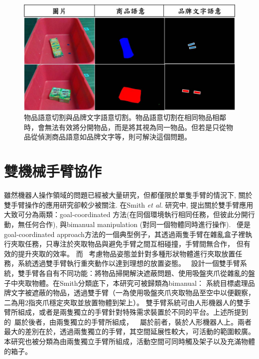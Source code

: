 \begin{figure}[H]
	\centering
	\includegraphics[height=!, width=1.0\linewidth, keepaspectratio=true]
	{./figures/product_vs_bn.jpg}
  \caption{物品語意切割與品牌文字語意切割。物品語意切割在相同物品相鄰時，會無法有效將分開物品，而是將其視為同一物品。但若是只從物品從偵測商品語意如品牌文字等，則可解決這個問題。}
  \label{figure:product_vs_bn}
\end{figure}

\section{雙機械手臂協作}
雖然機器人操作領域的問題已經被大量研究，但都僅限於單隻手臂的情況下, 關於雙手臂操作的應用研究卻較少被關注. 在Smith \textit{et al.} \cite{smith2012dual}研究中,
提出關於雙手臂應用大致可分為兩類：goal-coordinated 方法(在同個環境執行相同任務，但彼此分開行動，無任何合作), 與bimanual manipulation (對同一個物體同時進行操作).
~\cite{schwarz2018fast}便是goal-coordinated approach方法的一個典型例子，其透過兩隻手臂在雜亂盒子裡執行夾取任務，只專注於夾取物品與避免手臂之間互相碰撞，手臂間無合作，
但有效的提升夾取的效率。 而~\cite{harada2012pick} 考慮物品姿態並針對多種形狀物體進行夾取放置任務，系統透過雙手臂執行重夾動作以達到理想的放置姿態。
~\cite{miyazaki2017object}設計一個雙手臂系統，雙手臂各自有不同功能：將物品掃開解決遮蔽問題、使用吸盤夾爪從雜亂的盤子中夾取物體。在Smith分類底下，本研究可被歸類為bimanual： 系統目標處理品牌文字被遮蔽的物品，透過雙手臂（一為使用吸盤夾爪夾取物品至空中以便觀察，二為用2指夾爪穩定夾取並放置物體到架上）。
雙手臂系統可由人形機器人的雙手臂所組成，或者是兩隻獨立的手臂針對特殊需求裝置於不同的平台。上述所提到的~\cite{smith2012dual}屬於後者，由兩隻獨立的手臂所組成，~\cite{schwarz2018fast}~\cite{harada2012pick}屬於前者，裝於人形機器人上。兩者最大的差別在於，透過兩隻獨立的手臂，其空間延展性較大，可活動的範圍較廣。本研究也被分類為由兩隻獨立手臂所組成，活動空間可同時觸及架子以及充滿物體的箱子。

